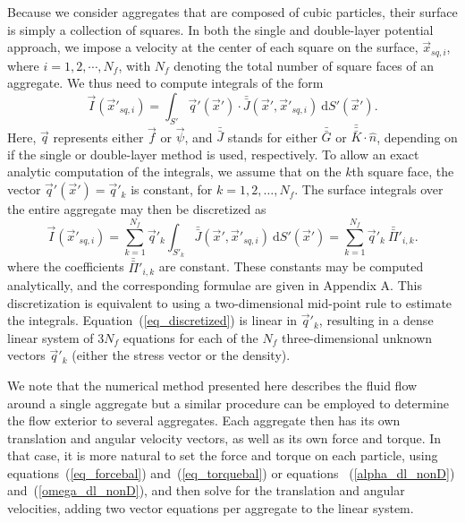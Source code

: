  \par
 Because we consider aggregates that are composed of cubic particles, their surface is simply a collection of squares.
 In both the single and double-layer potential approach, we impose a velocity at the center of each square on the surface, $\vec{x}_{sq,i}$, where $i = 1,2, \cdots, N_f$, with $N_f$ denoting the total number of square faces of an aggregate. We thus need to compute integrals of the form
 \begin{equation}
 \vec{I}(\vec{x}'_{sq,i}) = \int_{S'} \vec{q}'(\vec{x}') \cdot {\bar{\bar{J}}} (\vec{x}', \vec{x}'_{sq,i}) \ \text{d} S'(\vec{x}').
 \label{eq_pre_discretize}
 \end{equation}
 Here, $\vec{q}$ represents either $\vec{f}$ or $\vec{\psi}$, and $\bar{\bar{J}}$ stands for either $\bar{\bar{G}}$ or $\bar{\bar{\bar{K}}}\cdot\hat{n}$, depending on if the single or double-layer method is used, respectively.  To allow an exact analytic computation of the integrals, we assume that on the $k$th square face, the vector $\vec{q}'(\vec{x}') = \vec{q}'_k$ is constant, for $k = 1, 2, \dots, N_f$.
 The surface integrals over the entire aggregate may then be discretized as
 \begin{equation}
 \vec{I}(\vec{x}'_{sq,i})  =   \sum_{k=1}^{N_f}  \vec{q}'_k   \int_{S'_{k}} \bar{\bar{J}}(\vec{x}',\vec{x}'_{sq,i}) \ \text{d}S'(\vec{x}') = \sum_{k=1}^{N_f} \vec{q}'_k   \ \bar{\bar{\Pi}}'_{i,k}.
 \label{eq_discretized}
 \end{equation}
 where the coefficients $\bar{\bar{\Pi}}'_{i,k}$ are constant. These constants may be computed analytically, and the corresponding formulae are given in Appendix A.
  This discretization is equivalent to using a two-dimensional mid-point rule to estimate the integrals.  Equation~(\ref{eq_discretized}) is linear in $\vec{q}'_k$, resulting in a dense linear system of 3$N_f$ equations for each of the $N_f$ three-dimensional unknown vectors $\vec{q}'_k$ (either the stress vector or the density). 
 \par
 We note that the numerical method presented here describes the fluid flow around a single aggregate but a similar procedure can be employed to determine the flow exterior to several aggregates. Each aggregate then has its own translation and angular velocity vectors, as well as its own force and torque. In that case, it is more natural to set the force and torque on each particle, using equations~(\ref{eq_forcebal}) and~(\ref{eq_torquebal}) or equations ~(\ref{alpha_dl_nonD}) and~(\ref{omega_dl_nonD}), and then solve for the translation and angular velocities, adding two vector equations per aggregate to the linear system.
